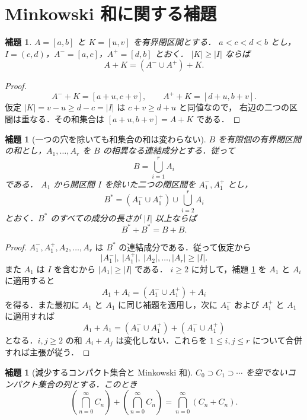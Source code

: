 \documentclass[10pt,a4paper]{ujarticle}
\newtheorem{lemma}[theorem]{補題}
\newcommand{\length}[1]{\lvert #1\rvert}
\begin{document}
\section{Minkowski 和に関する補題}

\begin{lemma}
\label{lemma:two-closed}
$A=[a,b]$ と $K=[u,v]$ を有界閉区間とする．
$a<c<d<b$ とし，$I=(c,d)$，$A^-=[a,c]$，$A^+=[d,b]$ とおく．
$\length K\ge\length I$ ならば
\[
  A+K=(A^-\cup A^+)+K.
\]
\end{lemma}

\begin{proof}
\[
  A^-+K=[a+u,c+v],\qquad A^++K=[d+u,b+v].
\]
仮定 $\length K=v-u\ge d-c=\length I$ は $c+v\ge d+u$ と同値なので，
右辺の二つの区間は重なる．その和集合は $[a+u,b+v]=A+K$ である．
\end{proof}

\begin{lemma}[一つの穴を除いても和集合の和は変わらない]
\label{lemma:sum-invariance}
$B$ を有限個の有界閉区間の和とし，$A_1,\ldots,A_r$ を
$B$ の相異なる連結成分とする．従って
\[
  B=\bigcup_{i=1}^r A_i
\]
である．
$A_1$ から開区間 $I$ を除いた二つの閉区間を $A_1^-,A_1^+$ とし，
\[
  B^*=(A_1^-\cup A_1^+)\cup\bigcup_{i=2}^r A_i
\]
とおく．$B^*$ のすべての成分の長さが $\length I$ 以上ならば
\[
  B^*+B^*=B+B.
\]
\end{lemma}

\begin{proof}
$A_1^-,A_1^+,A_2,\ldots,A_r$ は $B^*$ の連結成分である．従って仮定から
\[
  \length{A_1^-},\ \length{A_1^+},\
  \length{A_2},\ldots,\length{A_r}\ge\length I.
\]
また $A_1$ は $I$ を含むから $\length{A_1}\ge\length I$ である．
$i\ge2$ に対して，補題 \ref{lemma:two-closed} を $A_1$ と $A_i$ に適用すると
\[
  A_1+A_i=(A_1^-\cup A_1^+)+A_i
\]
を得る．また最初に $A_1$ と $A_1$ に同じ補題を適用し，次に
$A_1^-$ および $A_1^+$ と $A_1$ に適用すれば
\[
  A_1+A_1=(A_1^-\cup A_1^+)+(A_1^-\cup A_1^+)
\]
となる．$i,j\ge2$ の和 $A_i+A_j$ は変化しない．これらを
$1\le i,j\le r$ について合併すれば主張が従う．
\end{proof}

\begin{lemma}[減少するコンパクト集合と Minkowski 和]
\label{lemma:sum-cap-eq-cap-sum}
$C_0\supset C_1\supset\cdots$ を空でないコンパクト集合の列とする．このとき
\[
  \left(\bigcap_{n=0}^{\infty}C_n\right)
  +
  \left(\bigcap_{n=0}^{\infty}C_n\right)
  =
  \bigcap_{n=0}^{\infty}(C_n+C_n).
\]
\end{lemma}
\end{document}
